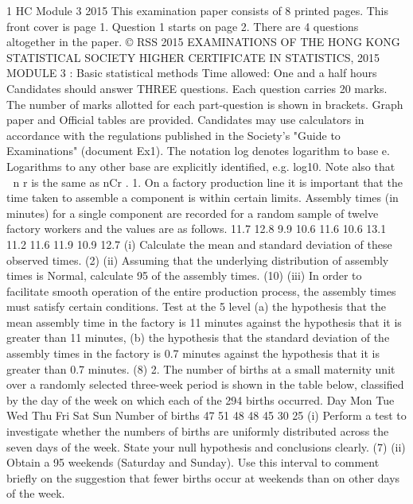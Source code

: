 1 HC Module 3 2015
This examination paper consists of 8 printed pages.
This front cover is page 1.
Question 1 starts on page 2.
There are 4 questions altogether in the paper.
© RSS 2015
EXAMINATIONS OF THE HONG KONG STATISTICAL SOCIETY
HIGHER CERTIFICATE IN STATISTICS, 2015
MODULE 3 : Basic statistical methods
Time allowed: One and a half hours
Candidates should answer THREE questions.
Each question carries 20 marks.
The number of marks allotted for each part-question is shown in brackets.
Graph paper and Official tables are provided.
Candidates may use calculators in accordance with the regulations published in
the Society's "Guide to Examinations" (document Ex1).
The notation log denotes logarithm to base e.
Logarithms to any other base are explicitly identified, e.g. log10.
Note also that
 
n
r
is the same as
nCr
.
1. On a factory production line it is important that the time taken to assemble a
component is within certain limits. Assembly times (in minutes) for a single
component are recorded for a random sample of twelve factory workers and the values
are as follows.
11.7 12.8 9.9 10.6 11.6 10.6 13.1 11.2 11.6 11.9 10.9 12.7
(i) Calculate the mean and standard deviation of these observed times.
(2)
(ii) Assuming that the underlying distribution of assembly times is Normal,
calculate 95%
of the assembly times.
(10)
(iii) In order to facilitate smooth operation of the entire production process, the
assembly times must satisfy certain conditions. Test at the 5%
level
(a) the hypothesis that the mean assembly time in the factory is 11 minutes
against the hypothesis that it is greater than 11 minutes,
(b) the hypothesis that the standard deviation of the assembly times in the
factory is 0.7 minutes against the hypothesis that it is greater than
0.7 minutes.
(8)
2. The number of births at a small maternity unit over a randomly selected three-week
period is shown in the table below, classified by the day of the week on which each of
the 294 births occurred.
Day Mon Tue Wed Thu Fri Sat Sun
Number of births 47 51 48 48 45 30 25
(i) Perform a test to investigate whether the numbers of births are uniformly
distributed across the seven days of the week. State your null hypothesis and
conclusions clearly.
(7)
(ii) Obtain a 95%
weekends (Saturday and Sunday). Use this interval to comment briefly on the
suggestion that fewer births occur at weekends than on other days of the week.
